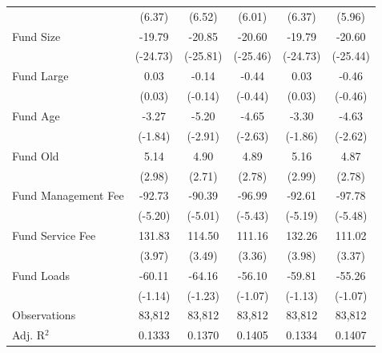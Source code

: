 {\begin{tabular}{l*{5}{c}}
                    &      (6.37)         &      (6.52)         &      (6.01)         &      (6.37)         &      (5.96)         \\
\addlinespace
Fund Size           &      -19.79\sym{***}&      -20.85\sym{***}&      -20.60\sym{***}&      -19.79\sym{***}&      -20.60\sym{***}\\
                    &    (-24.73)         &    (-25.81)         &    (-25.46)         &    (-24.73)         &    (-25.44)         \\
\addlinespace
Fund Large          &        0.03         &       -0.14         &       -0.44         &        0.03         &       -0.46         \\
                    &      (0.03)         &     (-0.14)         &     (-0.44)         &      (0.03)         &     (-0.46)         \\
\addlinespace
Fund Age            &       -3.27\sym{*}  &       -5.20\sym{***}&       -4.65\sym{***}&       -3.30\sym{*}  &       -4.63\sym{***}\\
                    &     (-1.84)         &     (-2.91)         &     (-2.63)         &     (-1.86)         &     (-2.62)         \\
\addlinespace
Fund Old            &        5.14\sym{***}&        4.90\sym{***}&        4.89\sym{***}&        5.16\sym{***}&        4.87\sym{***}\\
                    &      (2.98)         &      (2.71)         &      (2.78)         &      (2.99)         &      (2.78)         \\
\addlinespace
Fund Management Fee &      -92.73\sym{***}&      -90.39\sym{***}&      -96.99\sym{***}&      -92.61\sym{***}&      -97.78\sym{***}\\
                    &     (-5.20)         &     (-5.01)         &     (-5.43)         &     (-5.19)         &     (-5.48)         \\
\addlinespace
Fund Service Fee    &      131.83\sym{***}&      114.50\sym{***}&      111.16\sym{***}&      132.26\sym{***}&      111.02\sym{***}\\
                    &      (3.97)         &      (3.49)         &      (3.36)         &      (3.98)         &      (3.37)         \\
\addlinespace
Fund Loads          &      -60.11         &      -64.16         &      -56.10         &      -59.81         &      -55.26         \\
                    &     (-1.14)         &     (-1.23)         &     (-1.07)         &     (-1.13)         &     (-1.07)         \\
\midrule
Observations        &      83,812         &      83,812         &      83,812         &      83,812         &      83,812         \\
Adj. R$^{2}$        &      0.1333         &      0.1370         &      0.1405         &      0.1334         &      0.1407         \\
\bottomrule
\end{tabular}
}
